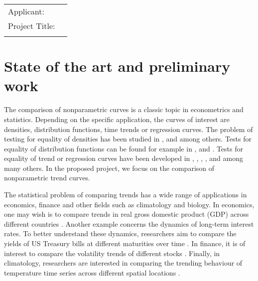 \documentclass[a4paper,12pt]{article}
\begin{document}
 

\vspace{0.25cm}

\noindent \hrulefill
\vspace{0.5cm}

\noindent\begin{tabular}{ll}
\large{Applicant:} & \noindent {\large Michael Vogt, University of Bonn} \\[0.1cm]
\large{Project Title:} & \noindent {\large New Methods and Theory for the Comparison of} \\
 & \noindent {\large Nonparametric Trend Curves}
\end{tabular}
\vspace{0.5cm}

\noindent \hrulefill



\section{State of the art and preliminary work}\label{sec:stateofart}


The comparison of nonparametric curves is a classic topic in econometrics and statistics. Depending on the specific application, the curves of interest are densities, distribution functions, time trends or regression curves. The problem of testing for equality of densities has been studied in \cite{Mammen1992}, \cite{Anderson1994} and \cite{Li2009} among others. Tests for equality of distribution functions can be found for example in \cite{Kiefer1959}, \cite{Anderson1962} and \cite{Finner2018}. Tests for equality of trend or regression curves have been developed in \cite{HaerdleMarron1990}, \cite{Hall1990}, \cite{Delgado1993}, \cite{DegrasWu2012}, \cite{Zhang2012} and \cite{Hidalgo2014} among many others. In the proposed project, we focus on the comparison of nonparametric trend curves.


The statistical problem of comparing trends has a wide range of applications in economics, finance and other fields such as climatology and biology. In economics, one may wish is to compare trends in real gross domestic product (GDP) across different countries \citep[cp.][]{Grier1989}. Another example concerns the dynamics of long-term interest rates. To better understand these dynamics, researchers aim to compare the yields of US Treasury bills at different maturities over time \citep[cp.][]{Park2009}. In finance, it is of interest to compare the volatility trends of different stocks \citep[cp.][]{Nyblom2000}. Finally, in climatology, researchers are interested in comparing the trending behaviour of temperature time series across different spatial locations \citep[cp.][]{KarolyWu2005}. 
\end{document}
